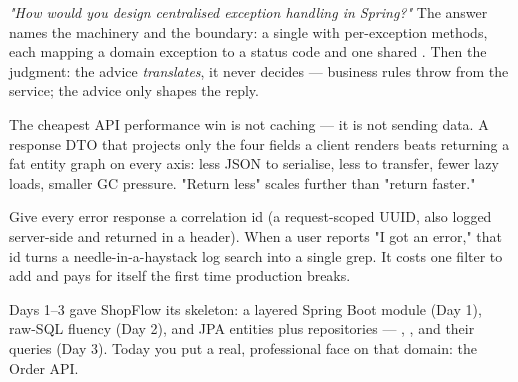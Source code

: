 \begin{interview}
\emph{"How would you design centralised exception handling in Spring?"} The answer names the machinery and the boundary: a single  with per-exception  methods, each mapping a domain exception to a status code and one shared . Then the judgment: the advice \emph{translates}, it never decides --- business rules throw from the service; the advice only shapes the reply.
\end{interview}

\begin{perfnote}
The cheapest API performance win is not caching --- it is not sending data. A response DTO that projects only the four fields a client renders beats returning a fat entity graph on every axis: less JSON to serialise, less to transfer, fewer lazy loads, smaller GC pressure. "Return less" scales further than "return faster."
\end{perfnote}

\begin{prodtip}
Give every error response a correlation id (a request-scoped UUID, also logged server-side and returned in a header). When a user reports "I got an error," that id turns a needle-in-a-haystack log search into a single grep. It costs one filter to add and pays for itself the first time production breaks.
\end{prodtip}


Days 1--3 gave ShopFlow its skeleton: a layered Spring Boot module (Day 1), raw-SQL fluency (Day 2), and JPA entities plus repositories --- , , and their queries (Day 3). Today you put a real, professional face on that domain: the Order API.

